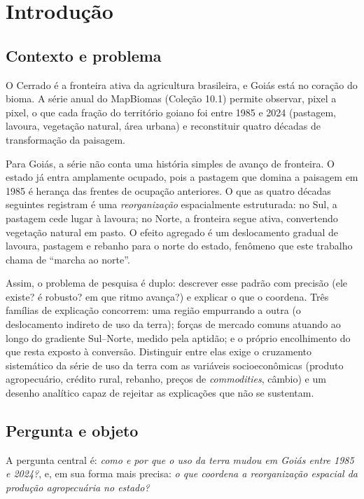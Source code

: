 \chapter{Introdução}
\label{cap:introducao}

\section{Contexto e problema}
\label{sec:intro-contexto}

O Cerrado é a fronteira ativa da agricultura brasileira, e Goiás está no
coração do bioma. A série anual do MapBiomas (Coleção 10.1) permite
observar, pixel a pixel, o que cada fração do território goiano foi entre
1985 e 2024 (pastagem, lavoura, vegetação natural, área urbana) e
reconstituir quatro décadas de transformação da paisagem.

Para Goiás, a série não conta uma história simples de avanço de fronteira.
O estado já entra amplamente ocupado, pois a pastagem que domina a paisagem em
1985 é herança das frentes de ocupação anteriores. O que as quatro décadas
seguintes registram é uma \emph{reorganização} espacialmente estruturada:
no Sul, a pastagem cede lugar à lavoura; no Norte, a fronteira segue ativa,
convertendo vegetação natural em pasto. O efeito agregado é um deslocamento
gradual de lavoura, pastagem e rebanho para o norte do estado, fenômeno
que este trabalho chama de ``marcha ao norte''.

Assim, o problema de pesquisa é duplo: descrever esse padrão com precisão (ele
existe? é robusto? em que ritmo avança?) e explicar o que o coordena.
Três famílias de explicação concorrem: uma região empurrando a outra (o
deslocamento indireto de uso da terra); forças de mercado comuns atuando
ao longo do gradiente Sul--Norte, medido pela aptidão; e o próprio
encolhimento do que resta
exposto à conversão. Distinguir entre elas exige o cruzamento sistemático da série de uso da terra com as
variáveis socioeconômicas (produto agropecuário, crédito rural, rebanho,
preços de \emph{commodities}, câmbio) e um desenho analítico capaz de rejeitar
as explicações que não se sustentam.

\section{Pergunta e objeto}
\label{sec:intro-pergunta}

A pergunta central é: \emph{como e por que o uso da terra mudou em Goiás
entre 1985 e 2024?}, e, em sua forma mais precisa: \emph{o que coordena a
reorganização espacial da produção agropecuária no estado?}

